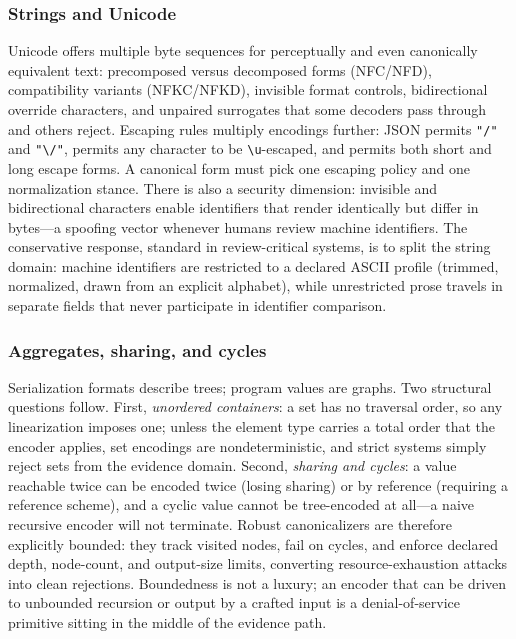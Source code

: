 \subsubsection{Strings and Unicode}\label{ch02:canon-unicode}

Unicode offers multiple byte sequences for perceptually and even
canonically equivalent text: precomposed versus decomposed forms
(NFC/NFD), compatibility variants (NFKC/NFKD), invisible format
controls, bidirectional override characters, and unpaired surrogates
that some decoders pass through and others reject. Escaping rules
multiply encodings further: JSON permits \texttt{"/"} and
\texttt{"\textbackslash/"}, permits any character to be
\texttt{\textbackslash u}-escaped, and permits both short and long
escape forms. A canonical form must pick one escaping policy and one
normalization stance. There is also a security dimension: invisible
and bidirectional characters enable identifiers that render
identically but differ in bytes---a spoofing vector whenever humans
review machine identifiers. The conservative response, standard in
review-critical systems, is to split the string domain: machine
identifiers are restricted to a declared ASCII profile (trimmed,
normalized, drawn from an explicit alphabet), while unrestricted
prose travels in separate fields that never participate in identifier
comparison.

\subsubsection{Aggregates, sharing, and cycles}\label{ch02:canon-cycles}

Serialization formats describe trees; program values are graphs. Two
structural questions follow. First, \emph{unordered containers}: a
set has no traversal order, so any linearization imposes one; unless
the element type carries a total order that the encoder applies, set
encodings are nondeterministic, and strict systems simply reject sets
from the evidence domain. Second, \emph{sharing and cycles}: a value
reachable twice can be encoded twice (losing sharing) or by
reference (requiring a reference scheme), and a cyclic value cannot
be tree-encoded at all---a naive recursive encoder will not
terminate. Robust canonicalizers are therefore explicitly bounded:
they track visited nodes, fail on cycles, and enforce declared depth,
node-count, and output-size limits, converting resource-exhaustion
attacks into clean rejections. Boundedness is not a luxury; an
encoder that can be driven to unbounded recursion or output by a
crafted input is a denial-of-service primitive sitting in the middle
of the evidence path.

